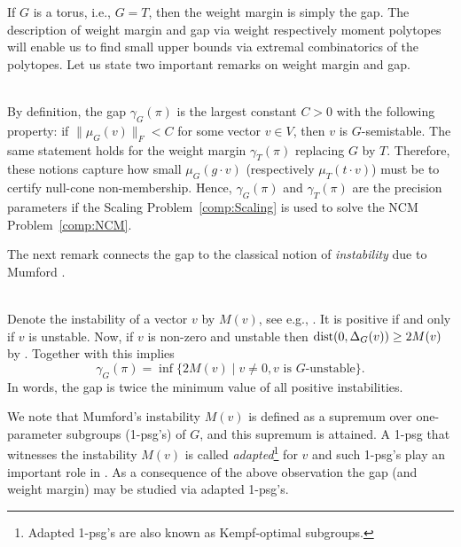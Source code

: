 If $G$ is a torus, i.e., $G=T$, then the weight margin is simply the gap. The description of weight margin and gap via weight respectively moment polytopes will enable us to find small upper bounds via extremal combinatorics of the polytopes.
Let us state two important remarks on weight margin and gap.

\begin{remark} \label{rem:PrecisionParameter}
	\ \\
	By definition, the gap $\gamma_G(\pi)$ is the largest constant $C > 0$ with the following property: if $\| \mu_G(v) \|_F < C$ for some vector $v\in V$, then $v$ is $G$-semistable. The same statement holds for the weight margin $\gamma_{T}(\pi)$ replacing $G$ by $T$. Therefore, these notions capture how small $\mu_G(g\cdot v)$ (respectively $\mu_{T}(t\cdot v)$) must be to certify null-cone non-membership. Hence, $\gamma_G(\pi)$ and $\gamma_T(\pi)$ are the precision parameters if the Scaling Problem~\ref{comp:Scaling} is used to solve the NCM Problem~\ref{comp:NCM}.
	\hfill\remSymbol
\end{remark}

The next remark connects the gap to the classical notion of \emph{instability} due to Mumford \cite{MumfordGITbook}.

\begin{remark}
	\ \\
	 Denote the instability of a vector $v$ by $M(v)$,  see e.g., \cite[Eq.~(9)]{NessStratification}. It is positive if and only if $v$ is unstable. Now, if $v$ is non-zero and unstable then $\operatorname{dist}(0,\Delta_G(v)) \geq 2 M(v)$ by \cite[(13)]{NessStratification}. Together with \cite[Theorem~6.1]{NessStratification} this implies
		\[\gamma_G(\pi) = \inf \big\lbrace 2M(v) \mid v \neq 0, v \text{ is } G\text{-unstable} \big\rbrace.\]
	In words, the gap is twice the minimum value of all positive instabilities.
	
	We note that Mumford's instability $M(v)$ is defined as a supremum over one-parameter subgroups (1-psg's) of $G$, and this supremum is attained. A 1-psg that witnesses the instability $M(v)$ is called \emph{adapted}\footnote{Adapted 1-psg's are also known as Kempf-optimal subgroups.}
	for $v$ and such 1-psg's play an important role in \cite{kempf1978instability}. As a consequence of the above observation the gap (and weight margin) may be studied via adapted 1-psg's.
	\hfill\remSymbol
\end{remark}


